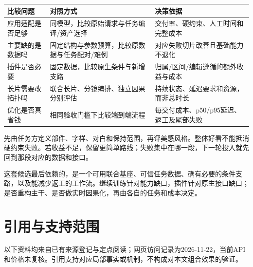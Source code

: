 {\def\LTcaptype{table} %
\small\setlength{\tabcolsep}{3pt}\renewcommand{\arraystretch}{1.18}
\begin{longtable}[]{@{}
  >{\raggedright\arraybackslash}p{}
  >{\raggedright\arraybackslash}p{}
  >{\raggedright\arraybackslash}p{}@{}}
\toprule\noalign{}
\begin{minipage}[b]{\linewidth}\raggedright
比较问题
\end{minipage} & \begin{minipage}[b]{\linewidth}\raggedright
对照方式
\end{minipage} & \begin{minipage}[b]{\linewidth}\raggedright
决策依据
\end{minipage} \\
\midrule\noalign{}
\endhead
\bottomrule\noalign{}
\endlastfoot
应用适配是否足够 & 同模型，比较原始请求与任务编译/资产选择 & 交付率、硬约束、人工时间和完整成本 \\
主要缺的是数据吗 & 固定结构与参数预算，比较原数据与任务配对/难例 & 对应失败切片改善且基础能力不退化 \\
插件是否必要 & 固定数据，比较原生条件与新增支路 & 归属/区间/编辑遵循的额外收益与成本 \\
长片需要改拓扑吗 & 联合长片、分镜编排、独立因果分别评估 & 持续状态、延迟要求和资源，而非总时长 \\
优化是否真省钱 & 相同验收门槛下比较端到端流程 & 每交付成本、p50/p95延迟、返工及尾部失败 \\
\end{longtable}
}

先由任务方定义部件、字样、对白和保持范围，再评美感风格。整体好看不能抵消硬约束失败。若收益不足，保留更简单路线；失败集中在哪一段，下一轮投入就先回到那段对应的数据和接口。

这套候选最后依赖的，是一个可用联合基座、可信任务数据、确有必要的条件支路，以及能减少返工的工作流。继续训练针对能力缺口，插件针对原生接口缺口；是否重构主干、是否做实时因果化，再由各自的任务和成本决定。

\section{引用与支持范围}\label{seedance-m27-ux5f15ux7528ux4e0eux652fux6301ux8303ux56f4}

以下资料均来自已有来源登记与定点阅读；网页访问记录为2026-11-22，当前API和价格未复核。引用支持对应局部事实或机制，不构成对本文组合效果的验证。

